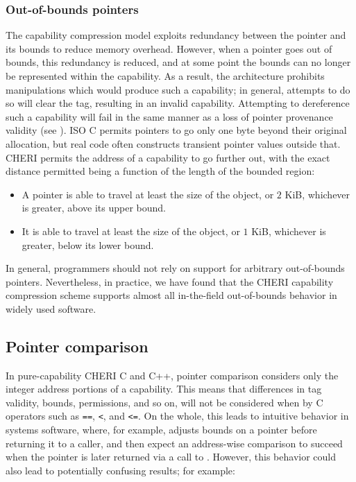 \documentclass[12pt,twoside,openright,a4paper]{article}
\newcommand{\ccode}[1]{{\small\ttfamily{#1}}}
\newcommand{\cfunc}[1]{{\ccode{#1()}}}
\newcommand{\note}[2]{{\color{blue}[ Note: #1 - #2]}}
\renewcommand{\note}[2]{\relax\ifhmode\unskip\fi}
\newcommand{\psnote}[1]{\note{#1}{Peter S.}}
\begin{document}
\subsubsection{Out-of-bounds pointers}
\label{sec:oob}

\note{I feel like this section wants a reference to CHERI Concentrate?}{nwf}

The capability compression model exploits redundancy between the pointer and
its bounds to reduce memory overhead.
However, when a pointer goes out of bounds, this redundancy is reduced, and at
some point the bounds can no longer be represented within the capability.
As a result, the architecture prohibits manipulations which would produce such
a capability; in general, attempts to do so will clear the tag, resulting in
an invalid capability.
Attempting to dereference such a capability will fail in the same
manner as a loss of pointer provenance validity (see
).
\psnote{Comment on whether that should immediately trap instead?}
ISO C permits pointers to go only one byte beyond their original
allocation, but real code often \psnote{not sure how strong to be there}
constructs transient pointer values outside that. 
CHERI permits the address of a capability to go further out, with
the exact distance permitted being 
a function of the length of the bounded region:

\begin{itemize}
\item A pointer is able to travel at least  the size of the object, or
  $2$ KiB, whichever is greater, above its upper bound.

\item It is able to travel at least  the size of the object, or $1$ KiB,
  whichever is greater, below its lower bound.
\end{itemize}

In general, programmers should not rely on support for arbitrary out-of-bounds
pointers.  Nevertheless, in practice, we have found that the CHERI capability
compression scheme supports almost all in-the-field out-of-bounds behavior in
widely used software.  

\subsection{Pointer comparison}

In pure-capability CHERI C and C++, pointer comparison considers only the
integer address portions of a capability.
This means that differences in tag validity, bounds, permissions, and so on,
will not be considered when by C operators such as \texttt{==}, \texttt{<}, and \texttt{<=}.
On the whole, this leads to intuitive behavior in systems software, where,
for example, \cfunc{malloc} adjusts bounds on a pointer before returning it to
a caller, and then expect an address-wise comparison to succeed when the
pointer is later returned via a call to \cfunc{free}.
However, this behavior could also lead to potentially confusing results; for
example:
\end{document}
